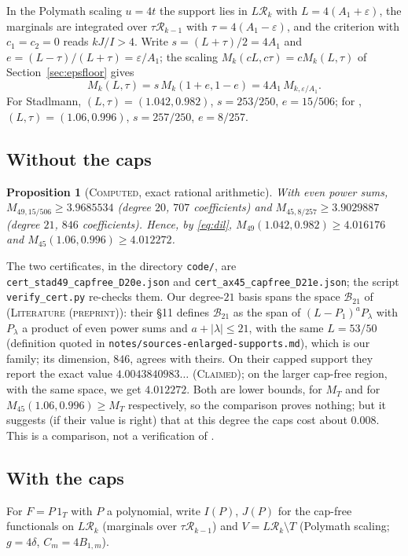 \documentclass[11pt]{amsart}
\newtheorem{proposition}[theorem]{Proposition}
\theoremstyle{definition}
\theoremstyle{remark}
\newcommand{\lbl}[1]{\textup{\textsc{#1}}}
\newcommand{\R}{\mathcal{R}}
\begin{document}
In the Polymath scaling $u=4t$ the support lies in $L\R_k$ with
$L=4(A_1+\varepsilon)$, the marginals are integrated over $\tau\R_{k-1}$ with
$\tau=4(A_1-\varepsilon)$, and the criterion with $c_1=c_2=0$ reads
$kJ/I>4$. Write $s=(L+\tau)/2=4A_1$ and $e=(L-\tau)/(L+\tau)=\varepsilon/A_1$;
the scaling $M_k(cL,c\tau)=cM_k(L,\tau)$ of Section~\ref{sec:epsfloor} gives
\begin{equation}\label{eq:dil}
M_k(L,\tau)=s\,M_k(1+e,1-e)=4A_1\,M_{k,\varepsilon/A_1}.
\end{equation}
For Stadlmann, $(L,\tau)=(1.042,0.982)$, $s=253/250$, $e=15/506$; for
\cite{Cha26}, $(L,\tau)=(1.06,0.996)$, $s=257/250$, $e=8/257$.

\subsection*{Without the caps}
\begin{proposition}[\lbl{Computed}, exact rational arithmetic]\label{prop:capfree}
With even power sums,
$M_{49,15/506}\ge3.9685534$ (degree $20$, $707$ coefficients) and
$M_{45,8/257}\ge3.9029887$ (degree $21$, $846$ coefficients). Hence, by
\eqref{eq:dil}, $M_{49}(1.042,0.982)\ge4.016176$ and
$M_{45}(1.06,0.996)\ge4.012272$.
\end{proposition}

\begin{sloppypar}
The two certificates, in the directory \texttt{code/}, are
\texttt{cert\_stad49\_capfree\_D20e.json} and
\texttt{cert\_ax45\_capfree\_D21e.json}; the script
\texttt{verify\_cert.py} re-checks them. Our degree-$21$ basis spans the
space $\mathcal B_{21}$ of \cite[Thm.~11.1]{Cha26} (\lbl{Literature
(preprint)}): their \S11 defines $\mathcal B_{21}$ as the span of
$(L-P_1)^aP_\lambda$ with $P_\lambda$ a product of even power sums and
$a+|\lambda|\le21$, with the same $L=53/50$ (definition quoted in
\texttt{notes/}\allowbreak\texttt{sources-enlarged-supports.md}), which is our
family; its dimension, $846$, agrees with theirs. On their capped support they report the exact value
$4.0043840983\ldots$ (\lbl{Claimed}); on the larger cap-free region, with the
same space, we get $4.012272$. Both are lower bounds, for $M_T$ and for
$M_{45}(1.06,0.996)\ge M_T$ respectively, so the comparison proves nothing;
but it suggests (if their value is right) that at this degree the caps cost
about $0.008$. This is a comparison, not a verification of \cite{Cha26}.
\end{sloppypar}

\subsection*{With the caps}
For $F=P\,1_T$ with $P$ a polynomial, write $I(P)$, $J(P)$ for the cap-free
functionals on $L\R_k$ (marginals over $\tau\R_{k-1}$) and $V=L\R_k\setminus T$
(Polymath scaling; $g=4\delta$, $C_m=4B_{1,m}$).
\end{document}

